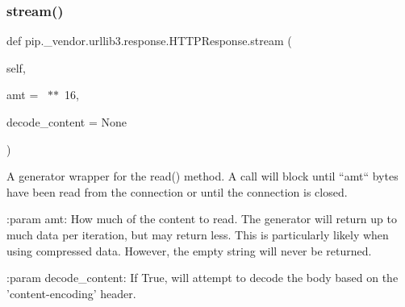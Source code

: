 \mbox{\label{classpip_1_1__vendor_1_1urllib3_1_1response_1_1HTTPResponse_aad7ca8755c86a2cfe56f28e64b7f9e77}} 
\subsubsection{\texorpdfstring{stream()}{stream()}}
{\footnotesize\ttfamily def pip.\+\_\+vendor.\+urllib3.\+response.\+H\+T\+T\+P\+Response.\+stream (\begin{DoxyParamCaption}\item[{}]{self,  }\item[{}]{amt = {~$\ast$$\ast$~16},  }\item[{}]{decode\+\_\+content = {\ttfamily None} }\end{DoxyParamCaption})}

\begin{DoxyVerb}A generator wrapper for the read() method. A call will block until
``amt`` bytes have been read from the connection or until the
connection is closed.

:param amt:
    How much of the content to read. The generator will return up to
    much data per iteration, but may return less. This is particularly
    likely when using compressed data. However, the empty string will
    never be returned.

:param decode_content:
    If True, will attempt to decode the body based on the
    'content-encoding' header.
\end{DoxyVerb}
 \mbox{\label{classpip_1_1__vendor_1_1urllib3_1_1response_1_1HTTPResponse_a2a1912a3eac26ffca9f80fa1ab140126}} 

